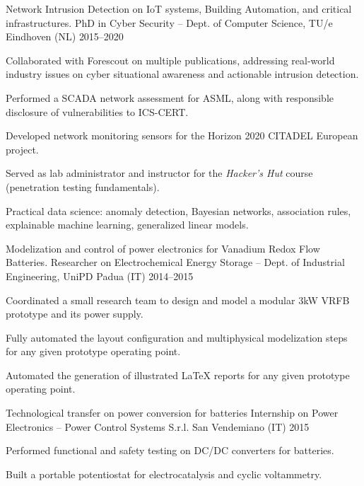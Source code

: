 
\begin{cventries}
    \cventry%
        {Network Intrusion Detection on IoT systems, Building Automation, and critical infrastructures.} %
        {PhD in Cyber Security -- Dept. of Computer Science, TU/e} %
        {Eindhoven (NL)} %
        {2015--2020} %
        {\begin{cvitems}
            \item Collaborated with Forescout on multiple publications, addressing real-world industry issues on cyber situational awareness and actionable intrusion detection.
            \item Performed a SCADA network assessment for ASML, along with responsible disclosure of vulnerabilities to ICS-CERT.
            \item Developed network monitoring sensors for the Horizon 2020 CITADEL European project.
            \item Served as lab administrator and instructor for the \emph{Hacker's Hut} course (penetration testing fundamentals).
            \item Practical data science: anomaly detection, Bayesian networks, association rules, explainable machine learning, generalized linear models.
        \end{cvitems}}


    \cventry%
        {Modelization and control of power electronics for Vanadium Redox Flow Batteries.}
        {Researcher on Electrochemical Energy Storage -- Dept. of Industrial Engineering, UniPD}
        {Padua (IT)}
        {2014--2015}
        {\begin{cvitems}
            \item Coordinated a small research team to design and model a modular 3kW VRFB prototype and its power supply.
            \item Fully automated the layout configuration and multiphysical modelization steps for any given prototype operating point.
            \item Automated the generation of illustrated LaTeX reports for any given prototype operating point.
        \end{cvitems}}

    \cventry%
        {Technological transfer on power conversion for batteries}
        {Internship on Power Electronics -- Power Control Systems S.r.l.}
        {San Vendemiano (IT)}
        {2015}
        {\begin{cvitems}
            \item Performed functional and safety testing on DC/DC converters for batteries.
            \item Built a portable potentiostat for electrocatalysis and cyclic voltammetry.
        \end{cvitems}}


\end{cventries}

